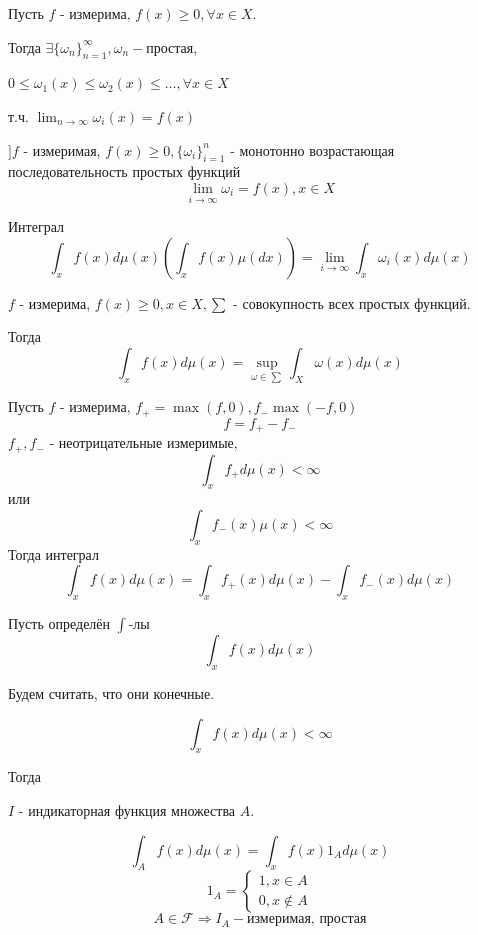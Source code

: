 \begin{definition}[Утверждение]
	Пусть $f$ - измерима, $f(x) \ge 0, \forall x \in X$.
	
	Тогда $\exists \{ \omega_n \}_{n=1}^{\infty}, \omega_n - \text{простая}$,
	
	$0 \le \omega_1(x) \le \omega_2(x) \le \dots , \forall x \in X$
	
	т.ч. $\lim_{n \to \infty} \omega_i(x) = f(x)$
\end{definition}

\begin{definition}
	$] f$ - измеримая, $f(x) \ge 0, \{ \omega_i \}_{i=1}^n$ - монотонно возрастающая последовательность простых функций
	\[ \lim_{i \to \infty} \omega_i = f(x), x \in X \]
	
	Интеграл
	\[ \int_{x} f(x) d \mu (x) \left( \int_{x} f(x) \mu (dx) \right) = \lim_{i \to \infty} \int_{x} \omega_i (x) d \mu (x) \]
\end{definition}

\begin{definition}
	$f$ - измерима, $f(x) \ge 0, x \in X, \sum$ - совокупность всех простых функций.
	
	Тогда 
	\[ \int_{x} f(x) d \mu(x) = \sup_{\omega \in \sum} \int_{X} \omega(x) d \mu (x) \]
\end{definition}

\begin{definition}
	Пусть $f$ - измерима, $f_+ = \max (f, 0), f_- \max (-f, 0)$
	\[ f = f_+ - f_- \]
	$f_+, f_-$ - неотрицательные измеримые,
	\[ \int_{x} f_+ d \mu (x) < \infty \]
	или
	\[ \int_{x} f_-(x) \mu (x) < \infty \]
	Тогда интеграл 
	\[ \int_{x} f(x) d \mu(x) = \int_x f_+(x) d \mu (x) - \int_{x} f_- (x) d \mu (x) \]
\end{definition}

Пусть определён $\int$-лы
\[ \int_{x} f(x) d \mu (x) \]

Будем считать, что они конечные.

\[ \int_{x} f(x) d \mu (x) < \infty \]

Тогда

\begin{remark}
	$I$ - индикаторная функция множества $A$.
\end{remark}

\[ \int_{A} f(x) d \mu (x) = \int_{x} f(x) 1_A d \mu (x) \]
\[ 1_A = 
\begin{cases}
	1, x \in A \\
	0, x \notin A
\end{cases}
\]
\[ A \in \mathcal{F} \Rightarrow I_A - \text{измеримая, простая} \]

